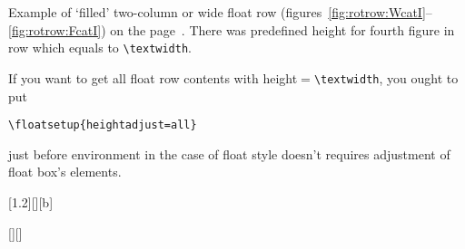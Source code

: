 \begin{sidewaystextbox*}
\wideemptyfloatpage
\tcapside[1.2\hsize]
{\TEXTBOX[ \text.]}
{\caption{Beside caption. \text. \text. \text}%
\label{rot:wbeside:text}}
\end{sidewaystextbox*}

\Text

\fi
\clearpage

\newlengthtocommand\setlength\rottextwidth{\textwidth}

Example of `filled' two-column or wide float row
(figures~\ref{fig:rotrow:WcatI}--\ref{fig:rotrow:FcatI})
on the page~\pageref{fig:rotrow:WcatI}.
There was predefined height for fourth figure in row which equals to \verb|\textwidth|.

If you want to get all float row contents with height${}={}$\verb|\textwidth|, you ought to put
\begin{verbatim}
\floatsetup{heightadjust=all}
\end{verbatim}
just before  environment in the case of float style doesn't requires adjustment of float box's
elements.

\begin{sidewaysfigure*}
\wideemptyfloatpage
\begin{floatrow}[4]
%
{\caption{Beside figure~I in wide rotated float row. Vertically centered}%
\label{fig:rotrow:WcatI}}%

[1.2\FBwidth][][b]
{\caption{Beside figure~II in wide rotated float row. Flushed to bottom of box}%
\label{fig:rotrow:BcatI}%
}%
{}%

%
{\caption{Beside figure~III in wide rotated float row. Flushed to top of object box}%
\label{fig:rotrow:mouseI}}%

[\Xhsize][\rottextwidth]
{\caption{Beside figure~IV in wide rotated float row.
When you put height argument in float row you must
put flag \protect{} (and maybe \protect{})
just before  to get
correct height of float box}\label{fig:rotrow:FcatI}}%
{\Resizebox\hsize{}}
\end{floatrow}
\end{sidewaysfigure*}

